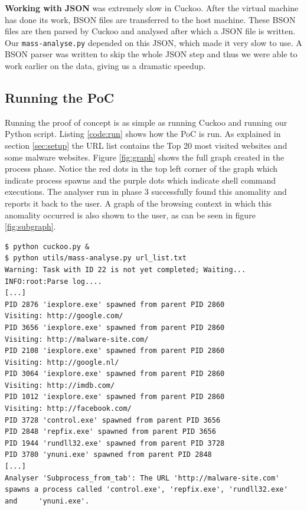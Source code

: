 \textbf{Working with JSON} was extremely slow in Cuckoo. After the virtual machine has done its work, BSON files are transferred to the host machine. These BSON files are then parsed by Cuckoo and analysed after which a JSON file is written. Our \texttt{mass-analyse.py} depended on this JSON, which made it very slow to use. A BSON parser was written to skip the whole JSON step and thus we were able to work earlier on the data, giving us a dramatic speedup.

\subsection{Running the PoC}

Running the proof of concept is as simple as running Cuckoo and running our Python script. Listing \ref{code:run} shows how the PoC is run. As explained in section \ref{sec:setup} the URL list contains the Top 20 most visited websites and some malware websites. Figure \ref{fig:graph} shows the full graph created in the process phase. Notice the red dots in the top left corner of the graph which indicate process spawns and the purple dots which indicate shell command executions. The analyser run in phase 3 successfully found this anomality and reports it back to the user. A graph of the browsing context in which this anomality occurred is also shown to the user, as can be seen in figure \ref{fig:subgraph}.

\begin{lstlisting}[caption={Mass analyser being run},label={code:run}]
$ python cuckoo.py &
$ python utils/mass-analyse.py url_list.txt
Warning: Task with ID 22 is not yet completed; Waiting...
INFO:root:Parse log....
[...]
PID 2876 'iexplore.exe' spawned from parent PID 2860
Visiting: http://google.com/
PID 3656 'iexplore.exe' spawned from parent PID 2860
Visiting: http://malware-site.com/
PID 2108 'iexplore.exe' spawned from parent PID 2860
Visiting: http://google.nl/
PID 3064 'iexplore.exe' spawned from parent PID 2860
Visiting: http://imdb.com/
PID 1012 'iexplore.exe' spawned from parent PID 2860
Visiting: http://facebook.com/
PID 3728 'control.exe' spawned from parent PID 3656
PID 2848 'repfix.exe' spawned from parent PID 3656
PID 1944 'rundll32.exe' spawned from parent PID 3728
PID 3780 'ynuni.exe' spawned from parent PID 2848
[...]
Analyser 'Subprocess_from_tab': The URL 'http://malware-site.com' spawns a process called 'control.exe', 'repfix.exe', 'rundll32.exe' and     'ynuni.exe'.
\end{lstlisting}


